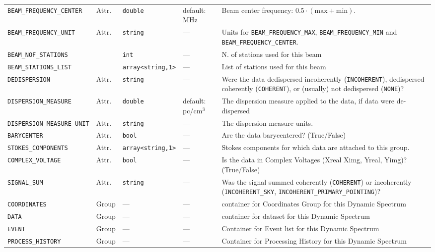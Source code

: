 \documentclass[a4paper,10pt,bibtotoc]{scrartcl}
\begin{document}
\begin{supertabular}{|p{3.5cm}p{1cm}p{2.5cm}p{3.5cm}p{5cm}|}
  \small{\verb|BEAM_FREQUENCY_CENTER|} & Attr. & \verb|double| & default: MHz & Beam center
  				frequency: $0.5\cdot \left( \mbox{max}+ \mbox{min}\right)$. \\
  \small{\verb|BEAM_FREQUENCY_UNIT|} & Attr. & \verb|string| & --- & Units for \verb|BEAM_FREQUENCY_MAX|,
  \verb|BEAM_FREQUENCY_MIN| and \verb|BEAM_FREQUENCY_CENTER|. \\ 
  \small{\verb|BEAM_NOF_STATIONS|}    &    & \verb|int|& --- & N. of stations used for this beam \\
  \small{\verb|BEAM_STATIONS_LIST|}   &    & \verb|array<string,1>|& --- & List of stations used for this beam\\
  \small{\verb|DEDISPERSION|}   & Attr.   & \verb|string| & --- & Were the
  data dedispersed incoherently (\verb|INCOHERENT|), dedispersed coherently
  (\verb|COHERENT|), or (usually) not dedispersed (\verb|NONE|)? \\
  \small{\verb|DISPERSION_MEASURE|}   & Attr.   & \verb|double| & default: pc/cm$^{3}$ &  The dispersion 
  measure applied to the data, if data were de-dispersed \\
  \small{\verb|DISPERSION_MEASURE_UNIT|}   & Attr.   & \verb|string| & --- &
  The dispersion measure units. \\
  \small{\verb|BARYCENTER|}   & Attr. & \verb|bool| & --- & Are the data barycentered?
  (True/False)\\
  \small{\verb|STOKES_COMPONENTS|} & Attr. & \verb|array<string,1>| & --- & Stokes
  components for which data are attached to this group. \\
  \small{\verb|COMPLEX_VOLTAGE|} & Attr. & \verb|bool| & --- & Is the data in Complex
  Voltages (Xreal Ximg, Yreal, Yimg)? (True/False) \\
  \small{\verb|SIGNAL_SUM|} & Attr. & \verb|string| & --- & Was the signal summed coherently
  (\texttt{COHERENT}) or incoherently (\texttt{INCOHERENT\_SKY}, \texttt{INCOHERENT\_PRIMARY\_POINTING})? \\
  \hline
  \small{\verb|COORDINATES|} & Group & --- & --- &  container for Coordinates
  Group for this Dynamic Spectrum \\
  \small{\verb|DATA|} & Group & --- & --- &  container for dataset for this
  Dynamic Spectrum \\
  \small{\verb|EVENT|} & Group & --- & --- & Container for Event list for this
  Dynamic Spectrum  \\
  \small{\verb|PROCESS_HISTORY|} & Group & --- & --- & Container for Processing History for this
  Dynamic Spectrum \\
  \hline
\end{supertabular}
\end{document}
